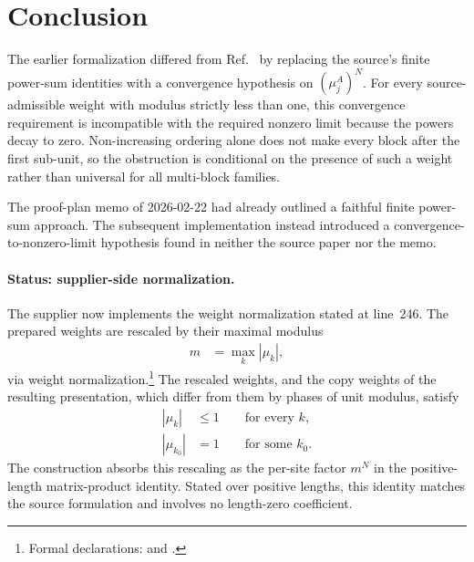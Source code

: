 \documentclass{article}
\begin{document}
\section{Conclusion}

The earlier formalization differed from Ref.~\cite{Cirac2016MPDO_arXiv} by
replacing the source's finite power-sum identities with a convergence hypothesis
on $(\mu_j^A)^N$. For every source-admissible weight with modulus strictly less
than one, this convergence requirement is incompatible with the required
nonzero limit because the powers decay to zero. Non-increasing ordering alone
does not make every block after the first sub-unit, so the obstruction is
conditional on the presence of such a weight rather than universal for all
multi-block families.

The proof-plan memo of 2026-02-22 had already outlined a faithful finite
power-sum approach. The subsequent implementation instead introduced a
convergence-to-nonzero-limit hypothesis found in neither the source paper nor
the memo.

\paragraph{Status: supplier-side normalization.}

The supplier now implements the weight normalization stated at line~246. The
prepared weights are rescaled by their maximal modulus
\begin{align}
    m
        &= \max_k |\mu_k|,
    \label{eq:cpsv16_cf_normalization_and_proportional_comparison_supplier_maximal_modulus}
\end{align}
via weight normalization.\footnote{Formal declarations:
and .} The rescaled weights,
and the copy weights of the resulting presentation, which differ from them by
phases of unit modulus, satisfy
\begin{align}
    |\mu_k|
        &\leq 1
        \qquad\text{for every }k,
    \label{eq:cpsv16_cf_normalization_and_proportional_comparison_supplier_weight_bound}\\
    |\mu_{k_0}|
        &= 1
        \qquad\text{for some }k_0.
    \label{eq:cpsv16_cf_normalization_and_proportional_comparison_supplier_unit_witness}
\end{align}
The construction absorbs this rescaling as the per-site factor $m^N$ in the
positive-length matrix-product identity. Stated over positive lengths, this
identity matches the source formulation and involves no length-zero
coefficient.
\end{document}
